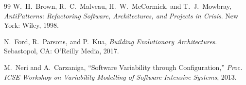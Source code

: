 \documentclass[conference]{IEEEtran}
\begin{document}
\begin{thebibliography}{99}
W.~H.~Brown, R.~C.~Malveau, H.~W.~McCormick, and T.~J.~Mowbray,
\emph{AntiPatterns: Refactoring Software, Architectures, and Projects
in Crisis}.
New York: Wiley, 1998.

N.~Ford, R.~Parsons, and P.~Kua,
\emph{Building Evolutionary Architectures}.
Sebastopol, CA: O'Reilly Media, 2017.

M.~Neri and A.~Carzaniga,
``Software Variability through Configuration,''
\emph{Proc. ICSE Workshop on Variability Modelling of Software-Intensive
Systems}, 2013.

\end{thebibliography}

\balance
\end{document}
